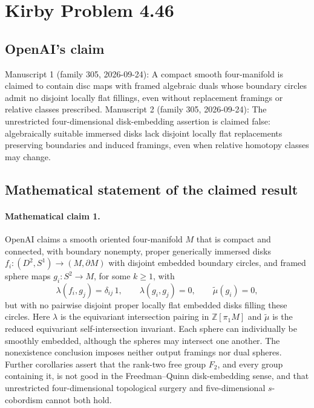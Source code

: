 \documentclass[11pt]{article}
\begin{document}
\section*{Kirby Problem 4.46}

\subsection{OpenAI's claim}
Manuscript 1 (family 305, 2026-09-24): A compact smooth four-manifold is claimed to contain disc maps with framed algebraic duals whose boundary circles admit no disjoint locally flat fillings, even without replacement framings or relative classes prescribed. Manuscript 2 (family 305, 2026-09-24): The unrestricted four-dimensional disk-embedding assertion is claimed false: algebraically suitable immersed disks lack disjoint locally flat replacements preserving boundaries and induced framings, even when relative homotopy classes may change.

\subsection{Mathematical statement of the claimed result}
\paragraph{Mathematical claim 1.} OpenAI claims a smooth oriented four-manifold $M$ that is compact and connected, with boundary nonempty, proper generically immersed disks $f_i:(D^2,S^1)\to(M,\partial M)$ with disjoint embedded boundary circles, and framed sphere maps $g_i:S^2\to M$, for some $k\ge1$, with
\[
\lambda(f_i,g_j)=\delta_{ij}\,1,\qquad\lambda(g_i,g_j)=0,\qquad\widetilde\mu(g_i)=0,
\]
but with no pairwise disjoint proper locally flat embedded disks filling these circles. Here $\lambda$ is the equivariant intersection pairing in $\mathbb Z[\pi_1M]$ and $\widetilde\mu$ is the reduced equivariant self-intersection invariant. Each sphere can individually be smoothly embedded, although the spheres may intersect one another. The nonexistence conclusion imposes neither output framings nor dual spheres. Further corollaries assert that the rank-two free group $F_2$, and every group containing it, is not good in the Freedman--Quinn disk-embedding sense, and that unrestricted four-dimensional topological surgery and five-dimensional $s$-cobordism cannot both hold.
\end{document}
